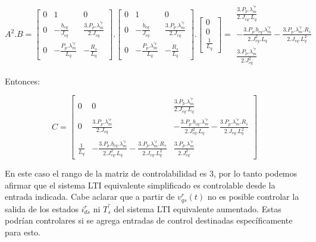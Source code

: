 \documentclass{article}
\begin{document}
\begin{equation*}
    A^2.B =
    \begin{bmatrix}
        0 & 1 & 0 \\
        0 & -\frac{b_{eq}}{J_{eq}} & \frac{3.P_p.\lambda_m^{\prime r}}{2.J_{eq}} \\
        0 & -\frac{P_p.\lambda_m^{\prime r}}{L_q} & -\frac{R_s}{L_q}
    \end{bmatrix}.
    \begin{bmatrix}
        0 & 1 & 0 \\
        0 & -\frac{b_{eq}}{J_{eq}} & \frac{3.P_p.\lambda_m^{\prime r}}{2.J_{eq}} \\
        0 & -\frac{P_p.\lambda_m^{\prime r}}{L_q} & -\frac{R_s}{L_q}
    \end{bmatrix}.
    \begin{bmatrix}
        0 \\
        0 \\
        \frac{1}{L_q}
    \end{bmatrix}
    =
    \begin{matrix}
        \frac{3.P_p.\lambda_m^{\prime r}}{2.J_{eq}.L_q} \\
        -\frac{3.P_p.b_{eq}.\lambda_m^{\prime r}}{2.J_{eq}^2.L_q} - \frac{3.P_p.\lambda_m^{\prime r}.R_s}{2.J_{eq}.L_q^2} \\
        \frac{3.P_p.\lambda_m^{\prime r}}{2.J_{eq}^2}
    \end{matrix}
\end{equation*}

Entonces:

\begin{equation*}
    C = 
    \begin{bmatrix}
        0 & 0 & \frac{3.P_p.\lambda_m^{\prime r}}{2.J_{eq}.L_q} \\
        0 & \frac{3.P_p.\lambda_m^{\prime r}}{2.J_{eq}} & -\frac{3.P_p.b_{eq}.\lambda_m^{\prime r}}{2.J_{eq}^2.L_q} - \frac{3.P_p.\lambda_m^{\prime r}.R_s}{2.J_{eq}.L_q^2} \\
        \frac{1}{L_q} & -\frac{3.P_p.b_{eq}.\lambda_m^{\prime r}}{2.J_{eq}^2.L_q} - \frac{3.P_p.\lambda_m^{\prime r}.R_s}{2.J_{eq}.L_q^2} & \frac{3.P_p.\lambda_m^{\prime r}}{2.J_{eq}^2}
    \end{bmatrix}
\end{equation*}

En este caso el rango de la matriz de controlabilidad es 3, por lo tanto podemos afirmar que el 
sistema LTI equivalente simplificado es controlable desde la entrada indicada. Cabe aclarar que 
a partir de $v_{qs}^r(t)$ no es posible controlar la salida de los estados $i_{ds}^r$ ni $T_s^°$ 
del sistema LTI equivalente aumentado. Estas podrían controlares si se agrega entradas de control 
destinadas específicamente para esto.
\end{document}
